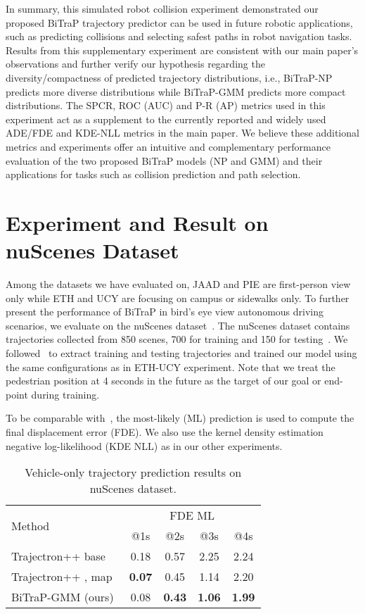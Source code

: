 \documentclass[letterpaper, 10 pt, conference]{ieeeconf}
\begin{document}
In summary, this simulated robot collision experiment demonstrated our proposed BiTraP trajectory predictor can be used in future robotic applications, such as predicting collisions and selecting safest paths in robot navigation tasks. Results from this supplementary experiment are consistent with our main paper's observations and further verify our hypothesis regarding the diversity/compactness of predicted trajectory distributions, i.e., BiTraP-NP predicts more diverse distributions while BiTraP-GMM predicts more compact distributions. The SPCR, ROC (AUC) and P-R (AP) metrics used in this experiment act as a supplement to the currently reported and widely used ADE/FDE and KDE-NLL metrics in the main paper. We believe these additional metrics and experiments offer an intuitive and complementary performance evaluation of the two proposed BiTraP models (NP and GMM) and their applications for tasks such as collision prediction and path selection. 

\section{Experiment and Result on nuScenes Dataset}
Among the datasets we have evaluated on, JAAD and PIE are first-person view only while ETH and UCY are focusing on campus or sidewalks only. To further present the performance of BiTraP in bird's eye view autonomous driving scenarios, we evaluate on the nuScenes dataset~\cite{nuscenes2019}. The nuScenes dataset contains trajectories collected from 850 scenes, 700 for training and 150 for testing~\cite{nuscenes2019}. We followed~\cite{salzmann2020trajectron++} to extract training and testing trajectories and trained our model using the same configurations as in ETH-UCY experiment. Note that we treat the pedestrian position at 4 seconds in the future as the target of our goal or end-point during training. 

 To be comparable with~\cite{salzmann2020trajectron++}, the most-likely (ML) prediction is used to compute the final displacement error (FDE). We also use the kernel density estimation negative log-likelihood (KDE NLL) as in our other experiments.


\begin{table}[htbp]
    \centering
    \begin{tabular}{l|cccc}
        \toprule
        \multirow{2}{*}{Method} & \multicolumn{4}{c}{FDE ML} \\
        \cmidrule{2-5} 
         & @1s & @2s & @3s & @4s \\
        \midrule
        Trajectron++ base~\cite{salzmann2020trajectron++} & 0.18 & 0.57 & 2.25 & 2.24 \\
        Trajectron++ , map~\cite{salzmann2020trajectron++} & \textbf{0.07} & 0.45 & 1.14 & 2.20 \\
        BiTraP-GMM (ours) & 0.08 & \textbf{0.43} & \textbf{1.06} & \textbf{1.99} \\
        \bottomrule
    \end{tabular}
    \caption{Vehicle-only trajectory prediction results on nuScenes dataset.}
    \label{tab:nuscenes_veh}
\end{table}
\end{document}
